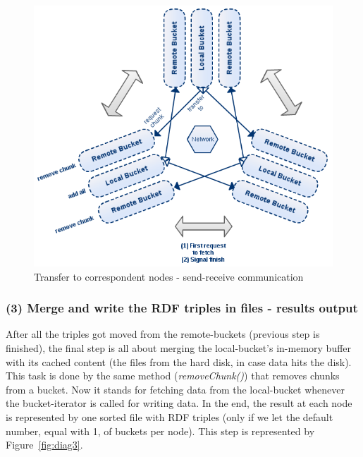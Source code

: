 \begin{figure}
\centering
\includegraphics[scale=0.6]{diag2}
\caption{Transfer to correspondent nodes - send-receive communication}
\label{fig:diag2}
\end{figure}

% 
\subsubsection*{(3) Merge and write the RDF triples in files - results output}

After all the triples got moved from the remote-buckets (previous step is finished), the final step is all about merging the local-bucket's in-memory buffer with its cached content (the files from the hard disk, in case data hits the disk). This task is done by the same method (\textit{removeChunk()}) that removes chunks from a bucket. Now it stands for fetching data from the local-bucket whenever the bucket-iterator is called for writing data. In the end, the result at each node is represented by one sorted file with RDF triples (only if we let the default number, equal with 1, of buckets per node). This step is represented by Figure~\ref{fig:diag3}.

